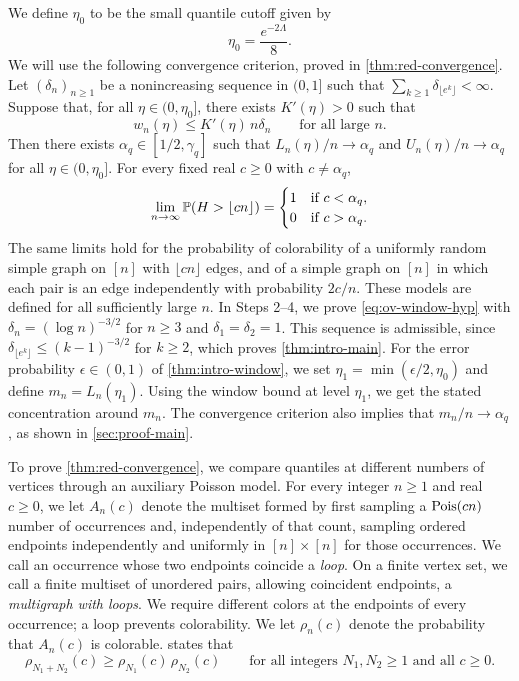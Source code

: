 We define $\eta_0$ to be the small quantile cutoff given by
\[
\eta_0 = \frac{e^{-2\Lambda}}8.
\]
We will use the following convergence criterion, proved in \cref{thm:red-convergence}. Let $(\delta_n)_{n \ge 1}$ be a nonincreasing sequence in $(0, 1]$ such that $\sum_{k \ge 1}\delta_{\lfloor e^k\rfloor} < \infty$. Suppose that, for all $\eta \in (0, \eta_0]$, there exists $K'(\eta) > 0$ such that
\begin{equation}\label{eq:ov-window-hyp}
w_n(\eta) \le K'(\eta) \, n \delta_n \qquad \text{for all large } n.
\end{equation}
Then there exists $\alpha_q \in [1/2, \gamma_q]$ such that $L_n(\eta)/n \to \alpha_q$ and $U_n(\eta)/n \to \alpha_q$ for all $\eta \in (0, \eta_0]$. For every fixed real $c \ge 0$ with $c \ne \alpha_q$,
\[
\lim_{n \to \infty}\mathbb P(H > \lfloor cn\rfloor) =
\begin{cases}
1 & \text{if } c < \alpha_q, \\
0 & \text{if } c > \alpha_q.
\end{cases}
\]
The same limits hold for the probability of colorability of a uniformly random simple graph on $[n]$ with $\lfloor cn\rfloor$ edges, and of a simple graph on $[n]$ in which each pair is an edge independently with probability $2c/n$. These models are defined for all sufficiently large $n$. In Steps 2--4, we prove \eqref{eq:ov-window-hyp} with $\delta_n = (\log n)^{-3/2}$ for $n \ge 3$ and $\delta_1 = \delta_2 = 1$. This sequence is admissible, since $\delta_{\lfloor e^k \rfloor} \le (k - 1)^{-3/2}$ for $k \ge 2$, which proves \cref{thm:intro-main}. For the error probability $\epsilon \in (0, 1)$ of \cref{thm:intro-window}, we set $\eta_1 = \min(\epsilon/2, \eta_0)$ and define $m_n = L_n(\eta_1)$. Using the window bound at level $\eta_1$, we get the stated concentration around $m_n$. The convergence criterion also implies that $m_n/n \to \alpha_q$, as shown in \cref{sec:proof-main}.

To prove \cref{thm:red-convergence}, we compare quantiles at different numbers of vertices through an auxiliary Poisson model. For every integer $n \ge 1$ and real $c \ge 0$, we let $A_n(c)$ denote the multiset formed by first sampling a $\operatorname{Pois}(cn)$ number of occurrences and, independently of that count, sampling ordered endpoints independently and uniformly in $[n] \times [n]$ for those occurrences. We call an occurrence whose two endpoints coincide a \emph{loop}. On a finite vertex set, we call a finite multiset of unordered pairs, allowing coincident endpoints, a \emph{multigraph with loops}. We require different colors at the endpoints of every occurrence; a loop prevents colorability. We let $\rho_n(c)$ denote the probability that $A_n(c)$ is colorable.  states that
\begin{equation}\label{eq:ov-product}
\rho_{N_1 + N_2}(c) \ge \rho_{N_1}(c) \, \rho_{N_2}(c) \qquad \text{for all integers } N_1, N_2 \ge 1 \text{ and all } c \ge 0.
\end{equation}

